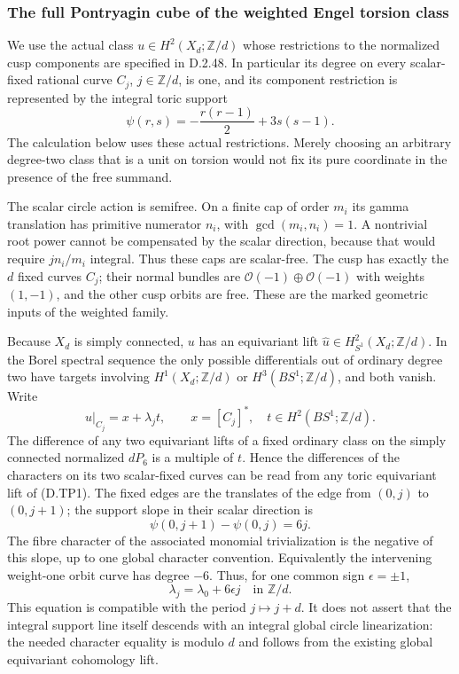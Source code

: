 \subsubsection*{The full Pontryagin cube of the weighted Engel torsion class}
We use the actual class $u\in H^2(X_d;\mathbb Z/d)$ whose
restrictions to the normalized cusp components are specified
in D.2.48. In particular its degree on every scalar-fixed
rational curve $C_j$, $j\in\mathbb Z/d$, is one, and its
component restriction is represented by the integral toric
support
\[
                  \psi(r,s)=-\frac{r(r-1)}2+3s(s-1).
                                                               \tag{D.TP1}
\]
The calculation below uses these actual restrictions. Merely
choosing an arbitrary degree-two class that is a unit on
torsion would not fix its pure coordinate in the presence
of the free summand.

The scalar circle action is semifree. On a finite cap of
order $m_i$ its gamma translation has primitive numerator
$n_i$, with $\gcd(m_i,n_i)=1$. A nontrivial root power cannot
be compensated by the scalar direction, because that would
require $j n_i/m_i$ integral. Thus these caps are scalar-free.
The cusp has exactly the $d$ fixed curves $C_j$; their normal
bundles are $\mathcal O(-1)\oplus\mathcal O(-1)$ with weights
$(1,-1)$, and the other cusp orbits are free. These are the
marked geometric inputs of the weighted family.

Because $X_d$ is simply connected, $u$ has an equivariant
lift $\widehat u\in H^2_{S^1}(X_d;\mathbb Z/d)$.
In the Borel spectral sequence the only possible
differentials out of ordinary degree two have targets
involving $H^1(X_d;\mathbb Z/d)$ or $H^3(BS^1;\mathbb Z/d)$,
and both vanish. Write
\[
         \widehat u|_{C_j}=x+\lambda_j t,
         \qquad x=[C_j]^*,\quad t\in H^2(BS^1;\mathbb Z/d).
                                                               \tag{D.TP2}
\]
The difference of any two equivariant lifts of a fixed
ordinary class on the simply connected normalized
$dP_6$ is a multiple of $t$. Hence the differences of
the characters on its two scalar-fixed curves can be
read from any toric equivariant lift of (D.TP1).
The fixed edges are the translates of the edge from
$(0,j)$ to $(0,j+1)$; the support slope in their scalar
direction is
\[
               \psi(0,j+1)-\psi(0,j)=6j.
                                                               \tag{D.TP3}
\]
The fibre character of the associated monomial
trivialization is the negative of this slope, up to
one global character convention. Equivalently the
intervening weight-one orbit curve has degree $-6$.
Thus, for one common sign $\epsilon=\pm1$,
\[
                    \lambda_j=\lambda_0+6\epsilon j
                                 \quad\text{in }\mathbb Z/d.
                                                               \tag{D.TP4}
\]
This equation is compatible with the period $j\mapsto j+d$.
It does not assert that the integral support line itself
descends with an integral global circle linearization:
the needed character equality is modulo $d$ and follows
from the existing global equivariant cohomology lift.

